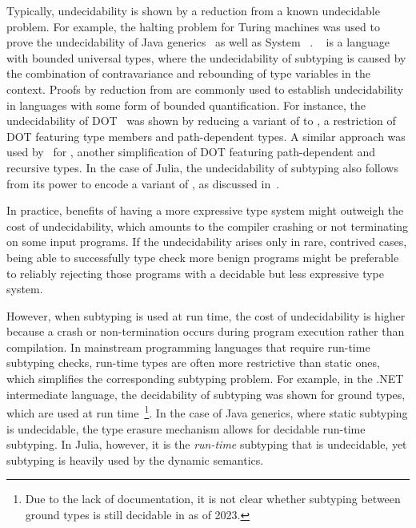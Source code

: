 Typically, undecidability is shown by a reduction from a known undecidable
problem. For example, the halting problem for Turing machines was used
to prove the undecidability of Java generics~\cite{grigore:java-undec:2017}
as well as System \FSub~\cite{pierce:bound-sub-undec:1992}.
\FSub~\cite{cardelli:fsub:1991} is a language with bounded universal types,
where the undecidability of subtyping is caused by the combination of
contravariance and rebounding of type variables in the context.
Proofs by reduction from \FSub are commonly used to establish
undecidability in languages with some form of bounded quantification.
For instance, the undecidability of DOT~\cite{hu:dot-undec:2020} was shown
by reducing a variant of \FSub to \DSub, a restriction of DOT featuring type
members and path-dependent types. A similar approach was used
by~\citet{mackay:path-dep-dec:2020} for \WyvCore, another simplification of
DOT featuring path-dependent and recursive types.
In the case of Julia, the undecidability of subtyping also follows from its
power to encode a variant of \FSub,
as discussed in~.

In practice, benefits of having a more expressive type system might outweigh
the cost of undecidability, which amounts to the compiler crashing or
not terminating on some input programs.
If the undecidability arises only in rare, contrived cases,
being able to successfully type check more benign programs
might be preferable to reliably rejecting those
programs with a decidable but less expressive type system.

However, when subtyping is used at run time, the cost of undecidability is
higher because a crash or non-termination occurs during program execution
rather than compilation.
In mainstream programming languages that require run-time subtyping checks,
run-time types are often more restrictive than static ones,
which simplifies the corresponding subtyping problem.
For example, in the .NET intermediate language,
the decidability of subtyping was shown for ground types,
which are used at run time~\cite{kennedy:nom-sub-var-dec:2007}\footnote{Due
to the lack of documentation, it is not clear whether subtyping between ground
types is still decidable in \CSharp as of 2023.}.
In the case of Java generics, where static subtyping is undecidable,
the type erasure mechanism allows for decidable run-time subtyping.
In Julia, however, it is the \emph{run-time} subtyping that is undecidable,
yet subtyping is heavily used by the dynamic semantics.

